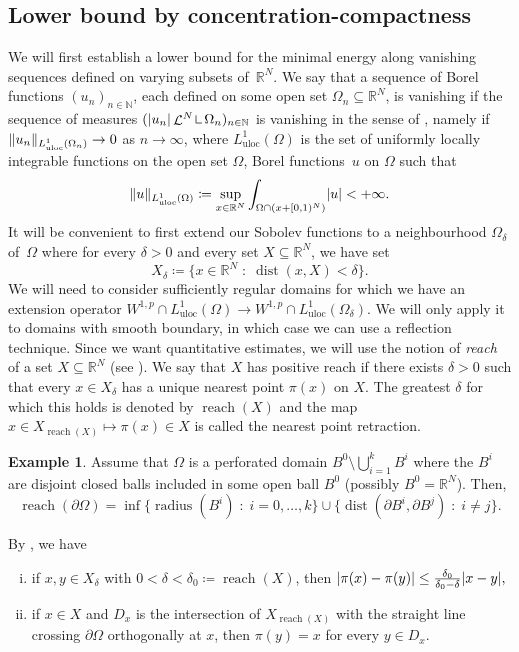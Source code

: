 \documentclass[JEP,XML,SOM,Unicode,published]{cedram}
\theoremstyle{plain}
\theoremstyle{definition}
\newtheorem{example}[theorem]{Example}
\newcommand{\N}{\mathbb{N}}
\newcommand{\R}{\mathbb{R}}
\newcommand{\mres}{\mathop{\hbox{\vrule height 6pt width .5pt depth 0pt \vrule height .5pt width 4pt depth 0pt}}\nolimits}
\newcommand{\uloc}{L^1_\mathrm{uloc}}
\newcommand{\st}{\;:\;}
\DeclarePairedDelimiter{\abs}{\lvert}{\rvert}
\DeclarePairedDelimiter{\norm}{\lVert}{\rVert}
\DeclareMathOperator{\lbm}{\mathcal{L}}
\DeclareMathOperator{\dist}{dist}
\DeclareMathOperator{\reach}{reach}
\begin{document}
\subsection{Lower bound by concentration-compactness}

We will first establish a lower bound for the minimal energy along vanishing sequences defined on varying subsets of~\(\R^N\). We say that a sequence of Borel functions \((u_n)_{n\in\N}\), each defined on some open set \(\Omega_n\subseteq\R^N\), is vanishing if the sequence of measures \((\abs{u_n}\lbm^N \mres \Omega_n)_{n\in\N}\) is vanishing in the sense of , namely if \(\norm{u_n}_{\uloc({\Omega}_n)}\to 0\) as \(n\to\infty\), where \(\uloc({\Omega})\) is the set of uniformly locally integrable functions on the open set \(\Omega\), \ie Borel functions~$u$ on $\Omega$ such that
\begin{equation}
\norm{u}_{\uloc({\Omega})}\coloneqq\sup_{x\in \R^N} \int_{\Omega\cap (x+[0,1)^N)}\abs{u}<+\infty.
\end{equation}
It will be convenient to first extend our Sobolev functions to a neighbourhood \(\Omega_\delta\) of~\(\Omega\) where for every \(\delta>0\) and every set \(X\subseteq\R^N\), we have set
\[
X_\delta\coloneqq\{x\in\R^N\st\dist(x,X)<\delta\}.
\]
We will need to consider sufficiently regular domains for which we have an extension operator \(W^{1,p}\cap \uloc (\Omega)\to W^{1,p}\cap \uloc(\Omega_\delta)\). We will only apply it to domains with smooth boundary, in which case we can use a reflection technique. Since we want quantitative estimates, we will use the notion of \emph{reach} of a set \(X\subseteq\R^N\) (see \cite{federerCurvatureMeasures1959}). We say that \(X\) has positive reach if there exists \(\delta>0\) such that every \(x\in X_\delta\) has a unique nearest point \(\pi(x)\) on \(X\). The greatest \(\delta\) for which this holds is denoted by \(\reach(X)\) and the map \(x\in X_{\reach(X)}\mapsto\pi(x)\in X\) is called the nearest point retraction.
\begin{example}\label{perforatedDomain}
Assume that \(\Omega\) is a perforated domain \(B^0\setminus \bigcup_{i=1}^k B^i\) where the \(B^i\) are disjoint closed balls included in some open ball \(B^0\) (possibly \(B^0=\R^N\)). Then,
\[
\reach(\partial\Omega)=
\inf\{\operatorname{radius}(B^i)\st i=0,\dots,k\}
\cup\{\dist(\partial B^i,\partial B^j)\st i\neq j\}.
\]
\end{example}

By \cite[Th.\,4.8]{federerCurvatureMeasures1959}, we have
\begin{enumerate}[(i),leftmargin=\normalparindent]
\item\label{lipschitzProjection} if \(x,y\in X_\delta\) with \(0<\delta<\delta_0\coloneqq\reach(X)\), then
\(
\abs{\pi(x)-\pi(y)}\leq \frac{\delta_0}{\delta_0-\delta}\abs{x-y},
\)
\item\label{orthogonalProjection}
if \(x\in X\) and \(D_x\) is the intersection of \(X_{\reach(X)}\) with the straight line crossing \(\partial\Omega\) orthogonally at \(x\), then
\(\pi(y)= x\) for every \(y\in D_x\).
\end{enumerate}
\end{document}

